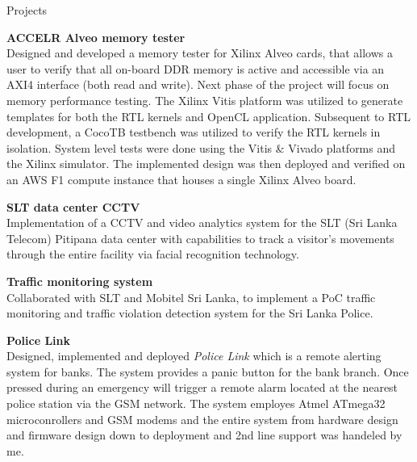 \documentclass[
	11pt, %
]{./../assets/resume} %
\begin{document}

\begin{rSection}{Projects}

	\textbf{ACCELR Alveo memory tester} \\
	Designed and developed a memory tester for Xilinx Alveo cards, that allows a user to verify that all on-board DDR memory is active and accessible via an AXI4 interface (both read and write). Next phase of the project will focus on memory performance testing. The Xilinx Vitis platform was utilized to generate templates for both the RTL kernels and OpenCL application. Subsequent to RTL development, a CocoTB testbench was utilized to verify the RTL kernels in isolation. System level tests were done using the Vitis \& Vivado platforms and the Xilinx simulator. The implemented design was then deployed and verified on an AWS F1 compute instance that houses a single Xilinx Alveo board.

	\textbf{SLT data center CCTV} \\
	Implementation of a CCTV and video analytics system for the SLT (Sri Lanka Telecom) Pitipana data center with capabilities to track a visitor's movements through the entire facility via facial recognition technology.

	\textbf{Traffic monitoring system} \\
	Collaborated with SLT and Mobitel Sri Lanka, to implement a PoC traffic monitoring and traffic violation detection system for the Sri Lanka Police.

	\textbf{Police Link} \\
	Designed, implemented and deployed \emph{Police Link} which is a remote alerting system for banks. The system provides a panic button for the bank branch. Once pressed during an emergency will trigger a remote alarm located at the nearest police station via the GSM network. The system employes Atmel ATmega32 microconrollers and GSM modems and the entire system from hardware design and firmware design down to deployment and 2nd line support was handeled by me.

\end{rSection}

\end{document}
